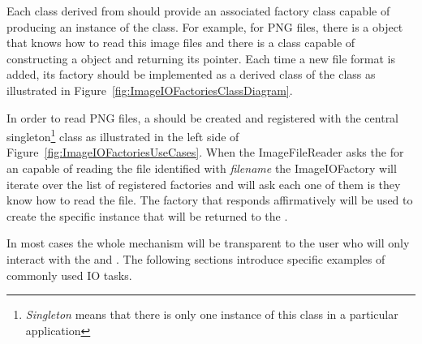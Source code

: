 Each class derived from  should provide an associated factory
class capable of producing an instance of the  class. For
example, for PNG files, there is a  object that knows how
to read this image files and there is a  class
capable of constructing a  object and returning its pointer.
Each time a new file format is added, its factory should be implemented as a
derived class of the  class as illustrated in
Figure~\ref{fig:ImageIOFactoriesClassDiagram}. 

In order to read PNG files, a  should be created and
registered with the central 
singleton\footnote{\emph{Singleton} means that there is only one instance of
this class in a particular application} class as illustrated in the left side
of Figure~\ref{fig:ImageIOFactoriesUseCases}. When the ImageFileReader asks the
 for an  capable of reading the file
identified with \emph{filename} the ImageIOFactory will iterate over the list
of registered factories and will ask each one of them is they know how to read
the file. The factory that responds affirmatively will be used to create the
specific  instance that will be returned to the
.

In most cases the whole mechanism will be transparent to the user who will only
interact with the  and . The
following sections introduce specific examples of commonly used IO tasks. 







